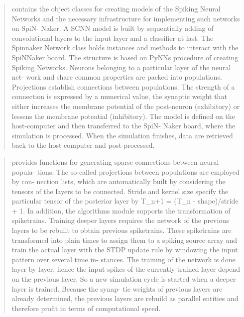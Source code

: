 \documentclass[letterpaper,10pt,english]{sphinxmanual}
\begin{document}
\begin{quote}

contains the object classes for creating models of the Spiking Neural Networks
and the necessary infrastructure for implementing such networks on SpiN-
Naker. A SCNN model is built by sequentially adding of convolutional layers
to the input layer and a classifier at last.
The Spinnaker Network class holds instances and methods to interact with
the SpiNNaker board. The structure is based on PyNNs procedure of creating
Spiking Networks. Neurons belonging to a particular layer of the neural net-
work and share common properties are packed into populations. Projections
establish connections between populations. The strength of a connection is
expressed by a numerical value, the synaptic weight that either increases the
membrane potential of the post-neuron (exhibitory) or lessens the membrane
potential (inhibitory).
The model is defined on the host-computer and then transferred to the SpiN-
Naker board, where the simulation is processed. When the simulation finishes,
data are retrieved back to the host-computer and post-processed.
\end{quote}

\begin{quote}

provides functions for generating sparse connections between neural popula-
tions. The so-called projections between populations are employed by con-
nection lists, which are automatically built by considering the tensors of the
layers to be connected. Stride and kernel size specify the particular tensor of
the posterior layer by T\_n+1 = (T\_n - shape)/stride + 1.
In addition, the algorithms module supports the transformation of spiketrains.
Training deeper layers requires the network of the previous layers to be rebuilt
to obtain previous spiketrains. These spiketrains are transformed into plain
times to assign them to a spiking source array and train the actual layer with
the STDP update rule by windowing the input pattern over several time in-
stances. The training of the network is done layer by layer, hence the input
spikes of the currently trained layer depend on the previous layer. So a new
simulation cycle is started when a deeper layer is trained. Because the synap-
tic weights of previous layers are already determined, the previous layers are
rebuild as parallel entities and therefore profit in terms of computational speed.
\end{quote}
\end{document}
